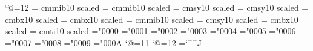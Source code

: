 \def\begpet{\vskip\petitsurround
\bgroup\petit}%
\def\endpet{\vskip\petitsurround
\egroup}%
\petit\sf\mib
\normalsize
\catcode`@=12 %
%
 \font \tamt            = cmmib10 scaled 
 \font \tams            = cmmib10 scaled 
 \let  \tamss=\mibXf
 \font \tast            = cmsy10 scaled 
 \font \tass            = cmsy10 scaled 
 \let  \tasss=\syXf
 \font \tatt            = cmbx10 scaled 
 \font \tats            = cmbx10 scaled 
 \let  \tatss=\bfXf
 \font \tbmt            = cmmib10 scaled 
 \let  \tbms=\mibXf
 \let  \tbmss=\mibIXf
 \font \tbst            = cmsy10 scaled 
 \let  \tbss=\syXf
 \let  \tbsss=\syIXf
 \font \tbtt            = cmbx10 scaled 
 \let  \tbts=\bfXf
 \let  \tbtss=\bfIXf
 \font \headnotefont    = cmti10 scaled 
\mathchardef\Gamma  ="0000
\mathchardef\Delta  ="0001
\mathchardef\Theta  ="0002
\mathchardef\Lambda ="0003
\mathchardef\Xi     ="0004
\mathchardef\Pi     ="0005
\mathchardef\Sigma  ="0006
\mathchardef\Upsilon="0007
\mathchardef\Phi    ="0008
\mathchardef\Psi    ="0009
\mathchardef\Omega  ="000A
%
\catcode`@=11 %
\newwrite\@info
\def\infuser#1{\immediate\write\@info{#1}}
\catcode`@=12 %
%
\newlinechar=`\^^J %
\def\newline{\hfill\break}%
\def\rahmen#1{\vbox{\hrule\line{\vrule\vbox to#1true
cm{\vfil}\hfil\vrule}\vfil\hrule}}
